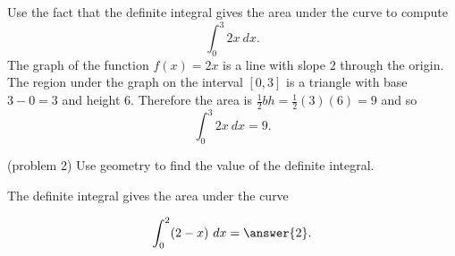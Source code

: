 \documentclass[handout]{ximera}
\begin{document}
\begin{example}[example 2]
Use the fact that the definite integral gives the area under the curve to compute
\[\int_0^3 2x \ dx.\]
The graph of the function $f(x) = 2x$ is a line with slope $2$ through the origin. 
The region under the graph on the interval $[0,3]$ is a triangle with base $3-0 = 3$ and height $6$. 
Therefore the area is $\frac12 bh = \frac12(3)(6) = 9$ and so
\[\int_0^3 2x \ dx =9.\]


\begin{image}
\end{image}

\end{example}

\begin{problem}(problem 2)
Use geometry to find the value of the definite integral.
\begin{hint}
The definite integral gives the area under the curve
\end{hint}
\[\int_{0}^{2} (2-x) \ dx = \answer{2}.\]
\end{problem}
\end{document}
